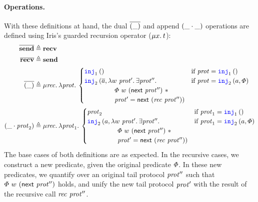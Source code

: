 \paragraph{\bf Operations.}
With these definitions at hand, the dual $\overline{(\_)}$ and append
$(\_ \cdot \_)$ operations are defined using Iris's guarded
recursion operator ($\MU \var.\term$):
\begingroup
\allowdisplaybreaks
\begin{align*}
  \dual{\actionsend} \eqdef{}& \actionrecv \\
  \dual{\actionrecv} \eqdef{}& \actionsend \\
\dual{(\_)} \eqdef{}&
  \MU \recvar. \Lam \prot.
  \begin{cases}
    \Inj 1 \TT
    & \textnormal{if } \prot = \Inj 1 \TT \\
    \Inj 2 (\dual a,
    \begin{array}[t]{@{} l @{}}
      \Lam \valB\ \prot'. \Exists \prot''. \\ \quad
    \begin{array}[t]{@{} l @{}}
     \pred\ \valB\ (\latertinj\ \prot'')\ \ast \\
     \prot' = \latertinj\ (\recvar\ \prot''))
    \end{array}\end{array}
    & \textnormal{if } \prot = \Inj 2 (a, \pred)
  \end{cases} \\
(\protapp{\_}{\prot_2}) \eqdef{}&
  \MU \recvar. \Lam \prot_1.
  \begin{cases}
    \prot_2
    & \textnormal{if } \prot_1 = \Inj 1 \TT \\
    \Inj 2 (a,
    \begin{array}[t]{@{} l @{}}
      \Lam \valB\ \prot'. \Exists \prot''. \\ \quad
    \begin{array}[t]{@{} l @{}}
      \pred\ \valB\ (\latertinj\ \prot'')\ \ast \\
      \prot' = \latertinj\ (\recvar\ \prot''))
    \end{array} \end{array}
    & \textnormal{if }\prot_1 = \Inj 2 (a, \pred)
  \end{cases}
\end{align*}
\endgroup
%
The base cases of both definitions are as expected.
In the recursive cases, we construct a new predicate, given the original
predicate $\varPhi$.
In these new predicates, we quantify over an original tail protocol $\mathit{prot}''$ such
that $\varPhi\ w\ (\textsf{\upshape next}\ \mathit{prot}'')$ holds, and unify the new tail
protocol $\mathit{prot}'$ with the result of the recursive call $\mathit{rec}\ \mathit{prot}''$.

